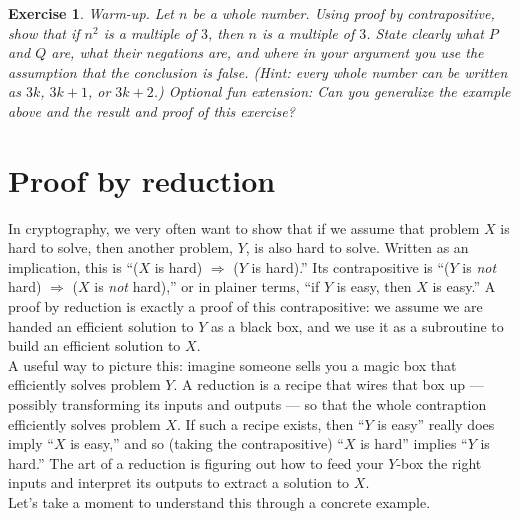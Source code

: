 \documentclass[12pt]{article}
\newtheorem{exercise}{Exercise}
\theoremstyle{definition}
\theoremstyle{remark}
\theoremstyle{definition}
\begin{document}
\begin{exercise}\label{ex:warmup-contrapositive}
Warm-up. Let $n$ be a whole number. Using proof by contrapositive, show that if $n^2$ is a multiple of $3$, then $n$ is a multiple of $3$. State clearly what $P$ and $Q$ are, what their negations are, and where in your argument you use the assumption that the conclusion is false. (Hint: every whole number can be written as $3k$, $3k+1$, or $3k+2$.) Optional fun extension: Can you generalize the example above and the result and proof of this exercise?
\end{exercise}

\section*{Proof by reduction}

In cryptography, we very often want to show that if we assume that problem $X$ is hard to solve, then another problem, $Y$, is also hard to solve. Written as an implication, this is ``($X$ is hard) $\Rightarrow$ ($Y$ is hard).'' Its contrapositive is ``($Y$ is \emph{not} hard) $\Rightarrow$ ($X$ is \emph{not} hard),'' or in plainer terms, ``if $Y$ is easy, then $X$ is easy.'' A proof by reduction is exactly a proof of this contrapositive: we assume we are handed an efficient solution to $Y$ as a black box, and we use it as a subroutine to build an efficient solution to $X$.\\

A useful way to picture this: imagine someone sells you a magic box that efficiently solves problem $Y$. A reduction is a recipe that wires that box up --- possibly transforming its inputs and outputs --- so that the whole contraption efficiently solves problem $X$. If such a recipe exists, then ``$Y$ is easy'' really does imply ``$X$ is easy,'' and so (taking the contrapositive) ``$X$ is hard'' implies ``$Y$ is hard.'' The art of a reduction is figuring out how to feed your $Y$-box the right inputs and interpret its outputs to extract a solution to $X$.\\

Let's take a moment to understand this through a concrete example.\\
\end{document}
